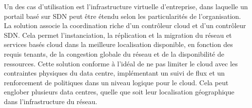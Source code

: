 Un des cas d'utilisation est l'infrastructure virtuelle d'entreprise, dans laquelle un portail basé sur SDN peut être étendu selon les particularités de l'organisation. La solution associe la coordination riche d'un contrôleur cloud et d'un contrôleur SDN. Cela permet l'instanciation, la réplication et la migration du réseau et services basés cloud dans la meilleure localisation disponible, en fonction des requis tenants, de la congestion globale du réseau et de la disponibilité de ressources. Cette solution conforme à l'idéal de ne pas limiter le cloud avec les contraintes physiques du data centre, implémentant un suivi de flux et un renforcement de politiques dans un niveau logique pour le cloud. Cela peut englober plusieurs data centres, quelle que soit leur localisation géographique dans l'infrastructure du réseau.





